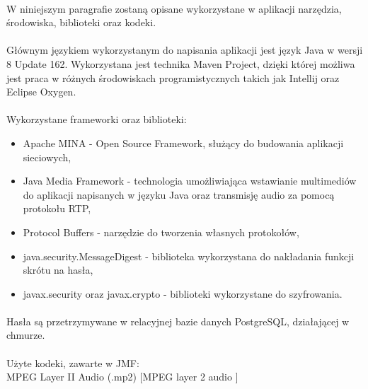 \documentclass[12pt,a4paper,notitlepage]{report}
\begin{document}
	\paragraph*{} W niniejszym paragrafie zostaną opisane wykorzystane w aplikacji narzędzia, środowiska, biblioteki oraz kodeki.
	\paragraph*{} Głównym językiem wykorzystanym do napisania aplikacji jest język Java w wersji 8 Update 162. Wykorzystana jest technika Maven Project, dzięki której możliwa jest praca w różnych środowiskach programistycznych takich jak Intellij oraz Eclipse Oxygen.
	\paragraph*{} Wykorzystane frameworki oraz biblioteki:
	\begin{itemize}
		\item Apache MINA - Open Source Framework, służący do budowania aplikacji sieciowych,
		\item Java Media Framework - technologia umożliwiająca wstawianie multimediów do aplikacji napisanych w języku Java oraz transmisję audio za pomocą protokołu RTP,
		\item Protocol Buffers - narzędzie do tworzenia własnych protokołów,
		\item java.security.MessageDigest - biblioteka wykorzystana do nakładania funkcji skrótu na hasła,
		\item javax.security oraz javax.crypto - biblioteki wykorzystane do szyfrowania.
	\end{itemize}
	\paragraph*{} Hasła są przetrzymywane w relacyjnej bazie danych PostgreSQL, działającej w chmurze.
	\paragraph*{} Użyte kodeki, zawarte w JMF:\\ MPEG Layer II Audio (.mp2) [MPEG layer 2 audio ]
\end{document}
